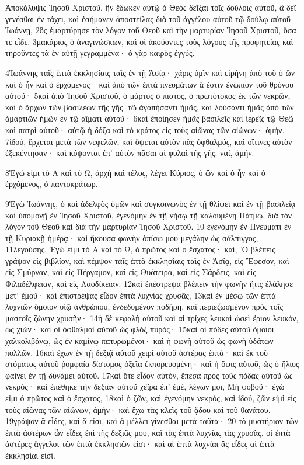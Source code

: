 \pstart
Ἀποκάλυψις Ἰησοῦ Χριστοῦ, ἣν ἔδωκεν αὐτῷ ὁ Θεός δεῖξαι τοῖς δούλοις αὐτοῦ, ἃ δεῖ γενέσθαι ἐν τάχει, καὶ ἐσήμανεν ἀποστείλας διὰ τοῦ ἀγγέλου αὐτοῦ τῷ δούλῳ αὐτοῦ Ἰωάννῃ, 2ὃς ἐμαρτύρησε τὸν λόγον τοῦ Θεοῦ καὶ τὴν μαρτυρίαν Ἰησοῦ Χριστοῦ, ὅσα τε εἶδε. 3μακάριος ὁ ἀναγινώσκων, καὶ οἱ ἀκούοντες τοὺς λόγους τῆς προφητείας καὶ τηροῦντες τὰ ἐν αὐτῇ γεγραμμένα· ὁ γὰρ καιρὸς ἐγγύς.
\pend

\pstart
4Ἰωάννης ταῖς ἑπτὰ ἐκκλησίαις ταῖς ἐν τῇ Ἀσίᾳ· χάρις ὑμῖν καὶ εἰρήνη ἀπὸ τοῦ ὁ ὢν καὶ ὁ ἦν καὶ ὁ ἐρχόμενος· καὶ ἀπὸ τῶν ἑπτὰ πνευμάτων ἅ ἐστιν ἐνώπιον τοῦ θρόνου αὐτοῦ· 5καὶ ἀπὸ Ἰησοῦ Χριστοῦ, ὁ μάρτυς ὁ πιστός, ὁ πρωτότοκος ἐκ τῶν νεκρῶν, καὶ ὁ ἄρχων τῶν βασιλέων τῆς γῆς. τῷ ἀγαπήσαντι ἡμᾶς, καὶ λούσαντι ἡμᾶς ἀπὸ τῶν ἁμαρτιῶν ἡμῶν ἐν τῷ αἵματι αὐτοῦ· 6καὶ ἐποίησεν ἡμᾶς βασιλεῖς καὶ ἱερεῖς τῷ Θεῷ καὶ πατρὶ αὐτοῦ· αὐτῷ ἡ δόξα καὶ τὸ κράτος εἰς τοὺς αἰῶνας τῶν αἰώνων· ἀμήν. 7ἰδού, ἔρχεται μετὰ τῶν νεφελῶν, καὶ ὄψεται αὐτὸν πᾶς ὀφθαλμός, καὶ οἵτινες αὐτὸν ἐξεκέντησαν· καὶ κόψονται ἐπ’ αὐτὸν πᾶσαι αἱ φυλαὶ τῆς γῆς. ναί, ἀμήν.
\pend

\pstart
8Ἐγώ εἰμι τὸ Α καὶ τὸ Ω, ἀρχὴ καὶ τέλος, λέγει Κύριος, ὁ ὢν καὶ ὁ ἦν καὶ ὁ ἐρχόμενος, ὁ παντοκράτωρ.
\pend

\pstart
9Ἐγὼ Ἰωάννης, ὁ καὶ ἀδελφὸς ὑμῶν καὶ συγκοινωνὸς ἐν τῇ θλίψει καὶ ἐν τῇ βασιλείᾳ καὶ ὑπομονῇ ἐν Ἰησοῦ Χριστοῦ, ἐγενόμην ἐν τῇ νήσῳ τῇ καλουμένῃ Πάτμῳ, διὰ τὸν λόγον τοῦ Θεοῦ καὶ διὰ τὴν μαρτυρίαν Ἰησοῦ Χριστοῦ. 10 ἐγενόμην ἐν Πνεύματι ἐν τῇ Κυριακῇ ἡμέρᾳ· καὶ ἤκουσα φωνὴν ὀπίσω μου μεγάλην ὡς σάλπιγγος, 11λεγούσης, Ἐγώ εἰμι τὸ Α καὶ τὸ Ω, ὁ πρῶτος καὶ ο ἔσχατος· καί, Ὃ βλέπεις γράψον εἰς βιβλίον, καὶ πέμψον ταῖς ἑπτὰ ἐκκλησίαις ταῖς ἐν Ἀσίᾳ, εἰς Ἔφεσον, καὶ εἰς Σμύρναν, καὶ εἰς Πέργαμον, καὶ εἰς Θυάτειρα, καὶ εἰς Σάρδεις, καὶ εἰς Φιλαδέλφειαν, καὶ εἰς Λαοδίκειαν. 12καὶ ἐπέστρεψα βλέπειν τὴν φωνὴν ἥτις ἐλάλησε μετ’ ἐμοῦ· καὶ ἐπιστρέψας εἶδον ἑπτὰ λυχνίας χρυσᾶς, 13καὶ ἐν μέσῳ τῶν ἑπτὰ λυχνιῶν ὅμοιον υἱῷ ἀνθρώπου, ἐνδεδυμένον ποδήρη, καὶ περιεζωσμένον πρὸς τοῖς μαστοῖς ζώνην χρυσῆν· 14ἡ δὲ κεφαλὴ αὐτοῦ καὶ αἱ τρίχες λευκαὶ ὡσεὶ ἔριον λευκόν, ὡς χιών· καὶ οἱ ὀφθαλμοὶ αὐτοῦ ὡς φλὸξ πυρός· 15καὶ οἱ πόδες αὐτοῦ ὅμοιοι χαλκολιβάνῳ, ὡς ἐν καμίνῳ πεπυρωμένοι· καὶ ἡ φωνὴ αὐτοῦ ὡς φωνὴ ὑδάτων πολλῶν. 16καὶ ἔχων ἐν τῇ δεξιᾷ αὐτοῦ χειρὶ αὐτοῦ ἀστέρας ἑπτά· καὶ ἐκ τοῦ στόματος αὐτοῦ ῥομφαία δίστομος ὀξεῖα ἐκπορευομένη· καὶ ἡ ὄψις αὐτοῦ, ὡς ὁ ἥλιος φαίνει ἐν τῇ δυνάμει αὐτοῦ. 17καὶ ὅτε εἶδον αὐτόν, ἔπεσα πρὸς τοὺς πόδας αὐτοῦ ὡς νεκρός· καὶ ἐπέθηκε τὴν δεξιὰν αὐτοῦ χεῖρα ἐπ’ ἐμέ, λέγων μοι, Μὴ φοβοῦ· ἐγώ εἰμι ὁ πρῶτος καὶ ὁ ἔσχατος, 18καὶ ὁ ζῶν, καὶ ἐγενόμην νεκρός, καὶ ἰδού, ζῶν εἰμὶ εἰς τοὺς αἰῶνας τῶν αἰώνων, ἀμήν· καὶ ἔχω τὰς κλεῖς τοῦ ᾅδου καὶ τοῦ θανάτου. 19γράψον ἃ εἶδες, καὶ ἅ εἰσι, καὶ ἃ μέλλει γίνεσθαι μετὰ ταῦτα· 20 τὸ μυστήριον τῶν ἑπτὰ ἀστέρων ὧν εἶδες ἐπὶ τῆς δεξιᾶς μου, καὶ τὰς ἑπτὰ λυχνίας τὰς χρυσᾶς. οἱ ἑπτὰ ἀστέρες ἄγγελοι τῶν ἑπτὰ ἐκκλησιῶν εἰσι· καὶ αἱ ἑπτὰ λυχνίαι ἂς εἶδες αἱ ἑπτὰ ἐκκλησίαι εἰσί.
\pend